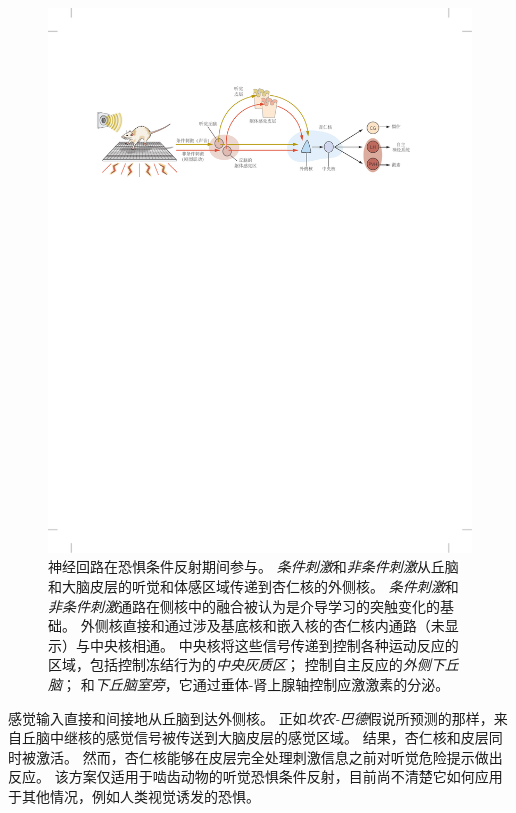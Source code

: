 \begin{figure}[htbp]
	\centering
	\includegraphics[width=1.0\linewidth]{chap42/fig_42_5}
	\caption{神经回路在恐惧条件反射期间参与。
		\textit{条件刺激}和\textit{\textit{非条件刺激}}从丘脑和大脑皮层的听觉和体感区域传递到杏仁核的外侧核。
		\textit{条件刺激}和\textit{非条件刺激}通路在侧核中的融合被认为是介导学习的突触变化的基础。
		外侧核直接和通过涉及基底核和嵌入核的杏仁核内通路（未显示）与中央核相通。
		中央核将这些信号传递到控制各种运动反应的区域，包括控制冻结行为的\textit{中央灰质区}；
		控制自主反应的\textit{外侧下丘脑}；
		和\textit{下丘脑室旁}，它通过垂体-肾上腺轴控制应激激素的分泌\cite{medina2002parallels}。}
	\label{fig:42_5}
\end{figure}


感觉输入直接和间接地从丘脑到达外侧核。
正如\textit{坎农-巴德}假说所预测的那样，来自丘脑中继核的感觉信号被传送到大脑皮层的感觉区域。
结果，杏仁核和皮层同时被激活。
然而，杏仁核能够在皮层完全处理刺激信息之前对听觉危险提示做出反应。
该方案仅适用于啮齿动物的听觉恐惧条件反射，目前尚不清楚它如何应用于其他情况，例如人类视觉诱发的恐惧。


